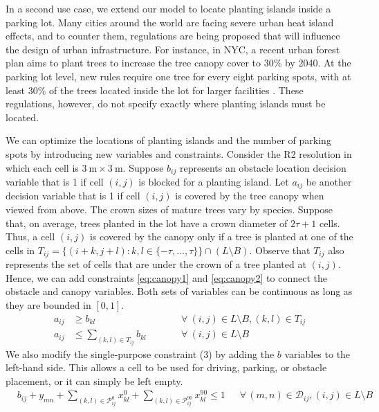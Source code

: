 \documentclass[10pt]{article}
\newcommand{\zeroparkvar}[2]{x^{0}_{#1#2}}
\newcommand{\ninetyparkvar}[2]{x^{90}_{#1#2}}
\newcommand{\drivevar}[2]{y_{#1#2}}
\newcommand{\lotset}{L}
\newcommand{\blockedset}{B}
\newcommand{\invzeroparkset}[2]{\mathcal{P}_{#1#2}^{0}}
\newcommand{\invninetyparkset}[2]{\mathcal{P}_{#1#2}^{90}}
\newcommand{\invdriveset}[2]{\mathcal{D}_{#1#2}}
\theoremstyle{definition}
\begin{document}
In a second use case, we extend our model to locate planting islands inside a parking lot. Many cities around the world are facing severe urban heat island effects, and to counter them, regulations are being proposed that will influence the design of urban infrastructure. For instance, in NYC, a recent urban forest plan aims to plant trees to increase the tree canopy cover to 30\% by 2040. At the parking lot level, new rules require one tree for every eight parking spots, with at least 30\% of the trees located inside the lot for larger facilities \citep{nyc_urban_forest_2026}. These regulations, however, do not specify exactly where planting islands must be located.

We can optimize the locations of planting islands and the number of parking spots by introducing new variables and constraints. Consider the R2 resolution in which each cell is $3~\text{m}\times3~\text{m}$. Suppose $b_{ij}$ represents an obstacle location decision variable that is 1 if cell $(i, j)$ is blocked for a planting island. Let $a_{ij}$ be another decision variable that is 1 if cell $(i, j)$ is covered by the tree canopy when viewed from above. The crown sizes of mature trees vary by species. Suppose that, on average, trees planted in the lot have a crown diameter of $2\tau + 1$ cells. Thus, a cell $(i, j)$ is covered by the canopy only if a tree is planted at one of the cells in $T_{ij} = \{(i + k, j + l) \colon k, l \in \{-\tau, \ldots, \tau\} \} \cap (L \setminus B)$. Observe that $T_{ij}$ also represents the set of cells that are under the crown of a tree planted at $(i, j)$. Hence, we can add constraints \eqref{eq:canopy1} and \eqref{eq:canopy2} to connect the obstacle and canopy variables. Both sets of variables can be continuous as long as they are bounded in $[0, 1]$.
\begin{align}
    a_{ij} & \geq b_{kl} &&  \qquad \forall~(i, j) \in L \setminus B, (k, l) \in T_{ij} \label{eq:canopy1} \\
    a_{ij} & \leq \sum_{(k, l) \in T_{ij}} b_{kl} &&  \qquad \forall~(i, j) \in L \setminus B \label{eq:canopy2}
\end{align}
We also modify the single-purpose constraint (3) by adding the $b$ variables to the left-hand side. This allows a cell to be used for driving, parking, or obstacle placement, or it can simply be left empty.
\begin{align}
& b_{ij} + \drivevar{m}{n} + \sum_{(k,l) \in \invzeroparkset{i}{j}} \zeroparkvar{k}{l} + \sum_{(k,l) \in \invninetyparkset{i}{j}} \ninetyparkvar{k}{l} \leq 1  \, \, \, \, \, \, \, \, \, \forall\,  (m, n) \in  \invdriveset{i}{j}, (i,j) \in \lotset \setminus \blockedset \label{eq:singlepurpose_zero_disaggregate_obstacle} 
\end{align}
\end{document}
